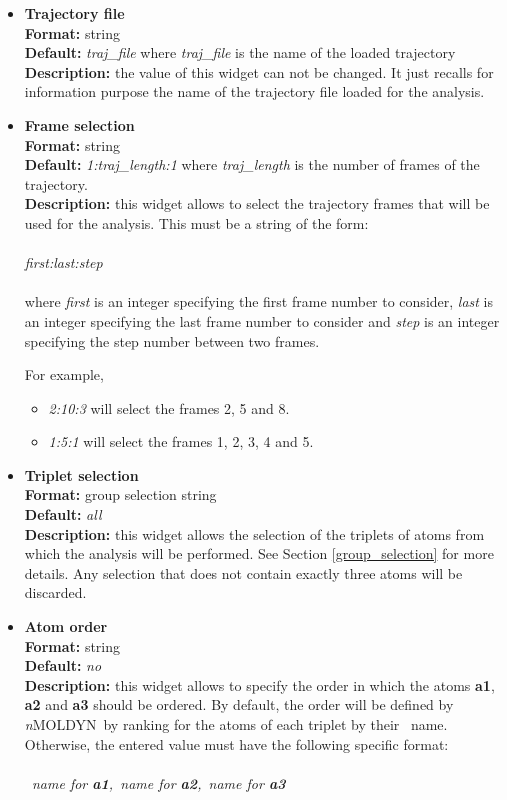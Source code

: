 \documentclass[a4paper,11pt]{report}
\newcommand{\NMOLDYN}{\textit{n}MOLDYN}
\begin{document}
\begin{itemize}
\item \textbf{Trajectory file}\\
\textbf{Format:} string\\
\textbf{Default:} \textit{traj\_file} where \textit{traj\_file} is the name of the loaded trajectory\\
\textbf{Description:} the value of this widget can not be changed. It just recalls for information purpose the name
of the trajectory file loaded for the analysis.

\item \textbf{Frame selection}\\
\textbf{Format:} string\\
\textbf{Default:} \textit{1:traj\_length:1} where \textit{traj\_length} is the number of frames of the trajectory.\\
\textbf{Description:} this widget allows to select the trajectory frames that will be used for the analysis. This must
be a string of the form:
\\\\
\textit{first:last:step}
\\\\
where \textit{first} is an integer specifying the first frame number to consider, \textit{last} is an integer specifying the last 
frame number to consider and \textit{step} is an integer specifying the step number between two frames.

For example,
\begin{itemize}
\item \textit{2:10:3} will select the frames 2, 5 and 8.
\item \textit{1:5:1} will select the frames 1, 2, 3, 4 and 5.
\end{itemize}

\item \textbf{Triplet selection}\\
\textbf{Format:} group selection string\\
\textbf{Default:} \textit{all}\\
\textbf{Description:} this widget allows the selection of the triplets of atoms from which the analysis will be 
performed. See Section \ref{group_selection} for more details. Any selection that does not contain exactly three atoms will 
be discarded.

\item \textbf{Atom order}\\
\textbf{Format:} string\\
\textbf{Default:} \textit{no}\\
\textbf{Description:} this widget allows to specify the order in which the atoms \textbf{a1}, \textbf{a2} and \textbf{a3} should be 
ordered. By default, the order will be defined by \NMOLDYN\ by ranking for the atoms of each triplet by their
\MMTK\ name. Otherwise, the entered value must have the following specific format:
\\\\
\textit{\MMTK\ name for \textbf{a1},\MMTK\ name for \textbf{a2},\MMTK\ name for \textbf{a3}}


\end{itemize}
\end{document}
